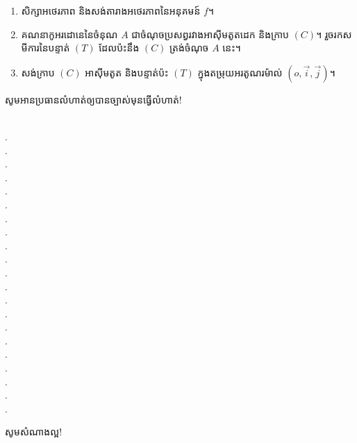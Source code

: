\documentclass{officialexam}
\begin{document}
\begin{enumerate}[I]
\begin{enumerate}[k]
		\item សិក្សាអថេរភាព និងសង់តារាងអថេរភាពនៃអនុគមន៍ $f$។
		\item គណនាកូអរដោនេនៃចំនុណ $A$ ជាចំណុចប្រសព្វរវាងអាសុីមតូតដេក និងក្រាប $\left(C\right)$។ រួចរកសមីការនៃបន្ទាត់ $\left(T\right)$ ដែលប៉ះនឹង $\left(C\right)$ ត្រង់ចំណុច $A$ នេះ។
		\item សង់ក្រាប $\left(C\right)$ អាសុីមតូត និងបន្ទាត់ប៉ះ $\left(T\right)$ ក្នុងតម្រុយអរតូណរម៉ាល់ $\left(o,\vec{i},\vec{j}\right)$។
	\end{enumerate}
		\begin{center}
		\sffamily\color{blue}
		សូមអានប្រធានលំហាត់ឲ្យបានច្បាស់មុនធ្វើលំហាត់!
	\end{center}
\end{enumerate}
\\
{\color{white}.}\dotfill
\\
{\color{white}.}\dotfill\\
{\color{white}.}\dotfill\\
{\color{white}.}\dotfill
\\
{\color{white}.}\dotfill\\
{\color{white}.}\dotfill\\
{\color{white}.}\dotfill
\\
{\color{white}.}\dotfill\\
{\color{white}.}\dotfill\\
{\color{white}.}\dotfill
\\
{\color{white}.}\dotfill\\
{\color{white}.}\dotfill\\
{\color{white}.}\dotfill
\\
{\color{white}.}\dotfill\\
{\color{white}.}\dotfill\\
{\color{white}.}\dotfill
\\
{\color{white}.}\dotfill\\
{\color{white}.}\dotfill\\
{\color{white}.}\dotfill
\\
{\color{white}.}\dotfill\\
{\color{white}.}\dotfill
\begin{center}
	\sffamily\color{blue}
	សូមសំណាងល្អ!
\end{center}\newpage
{\maketitle}
\end{document}
